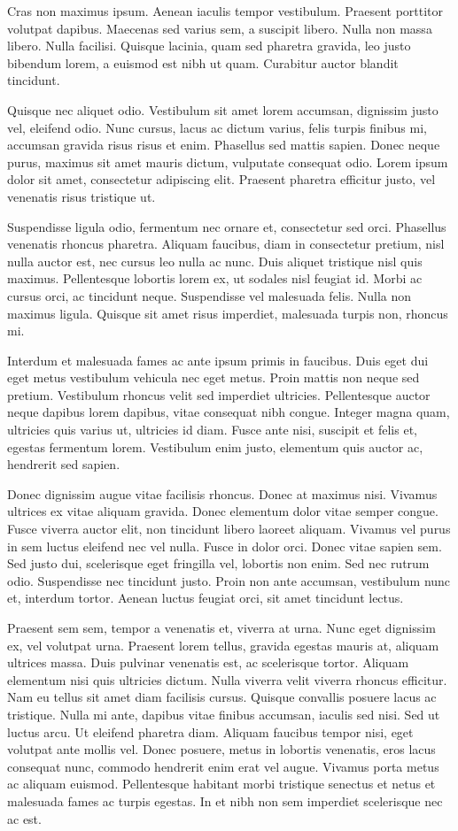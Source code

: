 Cras non maximus ipsum. Aenean iaculis tempor vestibulum. Praesent porttitor volutpat dapibus. Maecenas sed varius sem, a suscipit libero. Nulla non massa libero. Nulla facilisi. Quisque lacinia, quam sed pharetra gravida, leo justo bibendum lorem, a euismod est nibh ut quam. Curabitur auctor blandit tincidunt.

Quisque nec aliquet odio. Vestibulum sit amet lorem accumsan, dignissim justo vel, eleifend odio. Nunc cursus, lacus ac dictum varius, felis turpis finibus mi, accumsan gravida risus risus et enim. Phasellus sed mattis sapien. Donec neque purus, maximus sit amet mauris dictum, vulputate consequat odio. Lorem ipsum dolor sit amet, consectetur adipiscing elit. Praesent pharetra efficitur justo, vel venenatis risus tristique ut.

Suspendisse ligula odio, fermentum nec ornare et, consectetur sed orci. Phasellus venenatis rhoncus pharetra. Aliquam faucibus, diam in consectetur pretium, nisl nulla auctor est, nec cursus leo nulla ac nunc. Duis aliquet tristique nisl quis maximus. Pellentesque lobortis lorem ex, ut sodales nisl feugiat id. Morbi ac cursus orci, ac tincidunt neque. Suspendisse vel malesuada felis. Nulla non maximus ligula. Quisque sit amet risus imperdiet, malesuada turpis non, rhoncus mi.

Interdum et malesuada fames ac ante ipsum primis in faucibus. Duis eget dui eget metus vestibulum vehicula nec eget metus. Proin mattis non neque sed pretium. Vestibulum rhoncus velit sed imperdiet ultricies. Pellentesque auctor neque dapibus lorem dapibus, vitae consequat nibh congue. Integer magna quam, ultricies quis varius ut, ultricies id diam. Fusce ante nisi, suscipit et felis et, egestas fermentum lorem. Vestibulum enim justo, elementum quis auctor ac, hendrerit sed sapien.

Donec dignissim augue vitae facilisis rhoncus. Donec at maximus nisi. Vivamus ultrices ex vitae aliquam gravida. Donec elementum dolor vitae semper congue. Fusce viverra auctor elit, non tincidunt libero laoreet aliquam. Vivamus vel purus in sem luctus eleifend nec vel nulla. Fusce in dolor orci. Donec vitae sapien sem. Sed justo dui, scelerisque eget fringilla vel, lobortis non enim. Sed nec rutrum odio. Suspendisse nec tincidunt justo. Proin non ante accumsan, vestibulum nunc et, interdum tortor. Aenean luctus feugiat orci, sit amet tincidunt lectus.

Praesent sem sem, tempor a venenatis et, viverra at urna. Nunc eget dignissim ex, vel volutpat urna. Praesent lorem tellus, gravida egestas mauris at, aliquam ultrices massa. Duis pulvinar venenatis est, ac scelerisque tortor. Aliquam elementum nisi quis ultricies dictum. Nulla viverra velit viverra rhoncus efficitur. Nam eu tellus sit amet diam facilisis cursus. Quisque convallis posuere lacus ac tristique. Nulla mi ante, dapibus vitae finibus accumsan, iaculis sed nisi. Sed ut luctus arcu. Ut eleifend pharetra diam. Aliquam faucibus tempor nisi, eget volutpat ante mollis vel. Donec posuere, metus in lobortis venenatis, eros lacus consequat nunc, commodo hendrerit enim erat vel augue. Vivamus porta metus ac aliquam euismod. Pellentesque habitant morbi tristique senectus et netus et malesuada fames ac turpis egestas. In et nibh non sem imperdiet scelerisque nec ac est.



